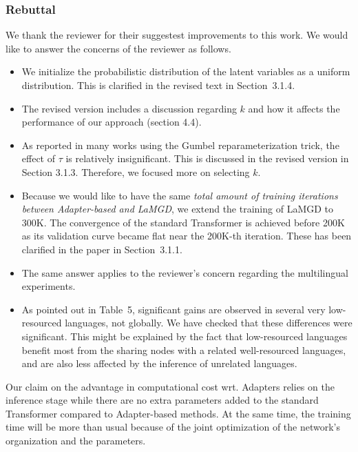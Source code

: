\documentclass[12pt,times,a4paper,twoside]{article}
\theoremstyle{definition}
\begin{document}
\subsubsection*{Rebuttal}
{\color{blue}%
We thank the reviewer for their suggestest improvements to this work. We would like to answer the concerns of the reviewer as follows.

\begin{itemize}
\item We initialize the probabilistic distribution of the latent variables as a uniform distribution. This is clarified in the revised text in Section~3.1.4.\done{}
\item The revised version includes a discussion regarding $k$ and how it affects the performance of our approach (section 4.4).
\item As reported in many works using the Gumbel reparameterization trick, the effect of $\tau$ is relatively insignificant. This is discussed in the revised version in Section 3.1.3. \done{}Therefore, we focused more on selecting $k$. \done{}
\item Because we would like to have the same \emph{total amount of training iterations between Adapter-based and LaMGD}, we extend the training of LaMGD to 300K. The convergence of the standard Transformer is achieved before 200K as its validation curve became flat near the 200K-th iteration. These has been clarified in the paper in Section~3.1.1. \done{} 
\item The same answer applies to the reviewer's concern regarding the multilingual experiments.
\item As pointed out\done{} in Table~5, significant gains are observed in several very low-resourced languages, not globally. We have checked that these differences were significant. This might be explained by the fact that low-resourced languages benefit most from the sharing nodes with a related well-resourced languages, and are also less affected by the inference of unrelated languages.
\end{itemize}

Our claim on the advantage in computational cost wrt. Adapters relies on the inference stage while there are no extra parameters added to the standard Transformer compared to Adapter-based methods. At the same time, the training time will be more than usual because of the joint optimization of the network's organization and the parameters. \done{}
}%
\end{document}
